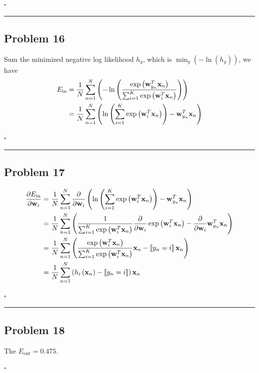 \documentclass[12pt]{article}
\newcommand*{\QEDB}{\hfill\ensuremath{\square}}
\newcommand{\ParTh}[1]{\left(#1\right)}
\newcommand{\BF}[1]{{\bf#1}}
\newcommand{\horrule}[1]{\rule{\linewidth}{#1}}
\begin{document}
\QEDB

\horrule{0.5pt}

\subsection*{Problem 16}

Sum the minimized negative log likelihood $h_y$, which is $\min_y\ParTh{-\ln\ParTh{h_y}}$, we have
\begin{align}
E_{\text{in}}&=\dfrac{1}{N}\sum_{n=1}^{N}\ParTh{-\ln\ParTh{\dfrac{\exp\ParTh{\BF{w}^T_{y_n}\BF{x}_n}}{\sum_{i=1}^{K}\exp\ParTh{\BF{w}^T_i\BF{x}_n}}}}\\
&=\dfrac{1}{N}\sum_{n=1}^{N}\ParTh{\ln\ParTh{\sum_{i=1}^{K}\exp\ParTh{\BF{w}^T_i\BF{x}_n}}-\BF{w}^T_{y_n}\BF{x}_n}
\end{align}

\QEDB

\horrule{0.5pt}

\subsection*{Problem 17}

\begin{align}
\dfrac{\partial E_{\text{in}}}{\partial \BF{w}_i}&=\dfrac{1}{N}\sum_{n=1}^{N}\dfrac{\partial}{\partial \BF{w}_i}\ParTh{\ln\ParTh{\sum_{i=1}^{K}\exp\ParTh{\BF{w}^T_i\BF{x}_n}}-\BF{w}^T_{y_n}\BF{x}_n}\\
&=\dfrac{1}{N}\sum_{n=1}^{N}\ParTh{\dfrac{1}{\sum_{i=1}^{K}\exp\ParTh{\BF{w}^T_i\BF{x}_n}}\dfrac{\partial}{\partial \BF{w}_i}\exp\ParTh{\BF{w}^T_i\BF{x}_n}-\dfrac{\partial}{\partial \BF{w}_i}\BF{w}^T_{y_n}\BF{x}_n}\\
&=\dfrac{1}{N}\sum_{n=1}^{N}\ParTh{\dfrac{\exp\ParTh{\BF{w}^T_i\BF{x}_n}}{\sum_{i=1}^{K}\exp\ParTh{\BF{w}^T_i\BF{x}_n}}\BF{x}_n-\left\llbracket y_n=i\right\rrbracket\BF{x}_n}\\
&=\dfrac{1}{N}\sum_{n=1}^{N}\ParTh{h_i\ParTh{\BF{x}_n}-\left\llbracket y_n=i\right\rrbracket}\BF{x}_n
\end{align}

\QEDB

\horrule{0.5pt}

\subsection*{Problem 18}

The $E_{\text{out}}=0.475$.

\QEDB
\end{document}
